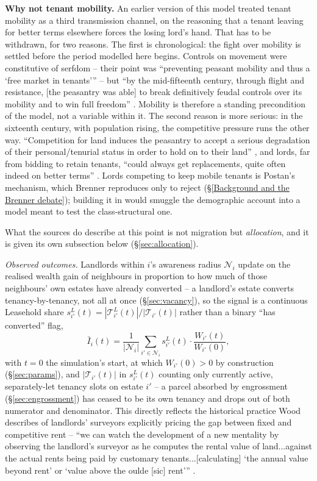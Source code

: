 \documentclass[11pt,english]{article}
\begin{document}
\textbf{Why not tenant mobility.} An earlier version of this model treated tenant mobility as a third transmission channel, on the reasoning that a tenant leaving for better terms elsewhere forces the losing lord's hand. That has to be withdrawn, for two reasons. The first is chronological: the fight over mobility is settled before the period modelled here begins. Controls on movement were constitutive of serfdom -- their point was ``preventing peasant mobility and thus a `free market in tenants''' \cite[p.44]{brenner1976agrarian} -- but ``by the mid-fifteenth century, through flight and resistance, [the peasantry was able] to break definitively feudal controls over its mobility and to win full freedom'' \cite[p.61]{brenner1976agrarian}. Mobility is therefore a standing precondition of the model, not a variable within it. The second reason is more serious: in the sixteenth century, with population rising, the competitive pressure runs the other way. ``Competition for land induces the peasantry to accept a serious degradation of their personal/tenurial status in order to hold on to their land'' \cite[p.38]{brenner1976agrarian}, and lords, far from bidding to retain tenants, ``could always get replacements, quite often indeed on better terms'' \cite[p.44]{brenner1976agrarian}. Lords competing to keep mobile tenants is Postan's mechanism, which Brenner reproduces only to reject (\S\ref{Background and the Brenner debate}); building it in would smuggle the demographic account into a model meant to test the class-structural one.

What the sources do describe at this point is not migration but \emph{allocation}, and it is given its own subsection below (\S\ref{sec:allocation}).

\emph{Observed outcomes.} Landlords within $i$'s awareness radius $\mathcal{N}_i$ update on the realised wealth gain of neighbours in proportion to how much of those neighbours' own estates have already converted -- a landlord's estate converts tenancy-by-tenancy, not all at once (\S\ref{sec:vacancy}), so the signal is a continuous Leasehold share $s_{i'}^{L}(t)=|\mathcal{T}_{i'}^{L}(t)|/|\mathcal{T}_{i'}(t)|$ rather than a binary ``has converted'' flag,
\begin{equation}
\bar I_i(t) = \frac{1}{|\mathcal{N}_i|} \sum_{i' \in \mathcal{N}_i} s_{i'}^{L}(t)\cdot \frac{W_{i'}(t)}{W_{i'}(0)},
\end{equation}
with $t=0$ the simulation's start, at which $W_{i'}(0)>0$ by construction (\S\ref{sec:params}), and $|\mathcal{T}_{i'}(t)|$ in $s_{i'}^{L}(t)$ counting only currently active, separately-let tenancy slots on estate $i'$ -- a parcel absorbed by engrossment (\S\ref{sec:engrossment}) has ceased to be its own tenancy and drops out of both numerator and denominator. This directly reflects the historical practice Wood describes of landlords' surveyors explicitly pricing the gap between fixed and competitive rent -- ``we can watch the development of a new mentality by observing the landlord's surveyor as he computes the rental value of land...against the actual rents being paid by customary tenants...[calculating] `the annual value beyond rent' or `value above the oulde [sic] rent''' \cite[p.101]{wood2002origin}.
\end{document}
